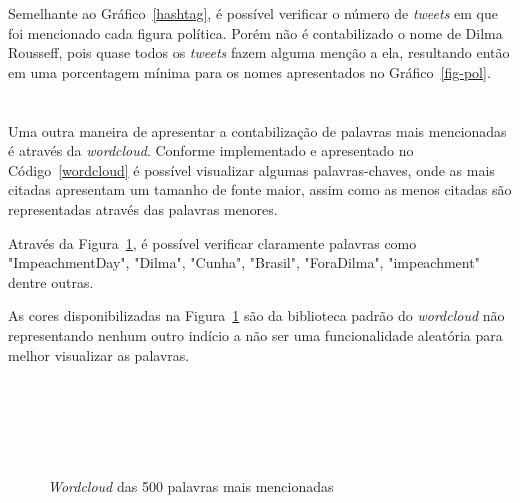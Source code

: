 Semelhante ao Gráfico~\ref{hashtag}, é possível verificar o número de \textit{tweets} em que foi mencionado cada figura política. Porém não é contabilizado o nome de Dilma Rousseff, pois quase todos os \textit{tweets} fazem alguma menção a ela, resultando então em uma porcentagem mínima para os nomes apresentados no Gráfico~\ref{fig-pol}. \\ \\ \\

Uma outra maneira de apresentar a contabilização de palavras mais mencionadas é através da \textit{wordcloud}. Conforme implementado e apresentado no Código~\ref{wordcloud} é possível visualizar algumas palavras-chaves, onde as mais citadas apresentam um tamanho de fonte maior, assim como as menos citadas são representadas através das palavras menores.

Através da Figura~\ref{fig:wordcloud}, é possível verificar claramente palavras como "ImpeachmentDay", "Dilma", "Cunha", "Brasil", "ForaDilma", "impeachment" dentre outras.

As cores disponibilizadas na Figura~\ref{fig:wordcloud} são da biblioteca padrão do \textit{wordcloud} não representando nenhum outro indício a não ser uma funcionalidade aleatória para melhor visualizar as palavras. \\ \\ \\ \\ \\ \\

\begin{figure}[h]
	\centering
	\caption{\textit{Wordcloud} das 500 palavras mais mencionadas}
	\vspace{-0.3cm}
	\label{fig:wordcloud}
\end{figure}


